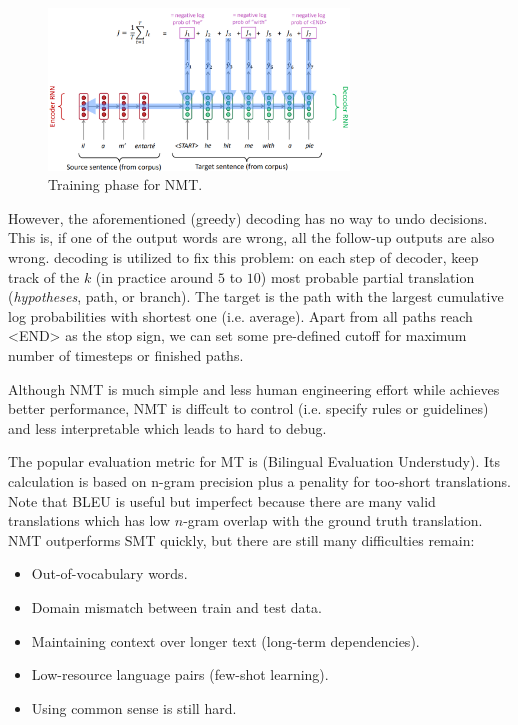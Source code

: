 \begin{figure}[!thp]
	\centerline{\includegraphics[width=8.0cm]{figs/NMT_training.png}}
	\caption{Training phase for NMT.}
	\label{fig:NMT_training}
\end{figure}

However, the aforementioned (greedy) decoding has no way to undo decisions. This is, if one of the output words are wrong, all the follow-up outputs are also wrong.
 decoding is utilized to fix this problem: on each step of decoder, keep track of the $k$ (in practice around $5$ to $10$) most probable partial translation (\emph{hypotheses}, path, or branch).
The target is the path with the largest cumulative log probabilities with shortest one (i.e. average).
Apart from all paths reach <END> as the stop sign, we can set some pre-defined cutoff for maximum number of timesteps or finished paths.

Although NMT is much simple and less human engineering effort while achieves better performance, NMT is diffcult to control (i.e. specify rules or guidelines) and less interpretable which leads to hard to debug.

The popular evaluation metric for MT is  (Bilingual Evaluation Understudy).
Its calculation is based on n-gram precision plus a penality for too-short translations.
Note that BLEU is useful but imperfect because there are many valid translations which has low $n$-gram overlap with the ground truth translation.
NMT outperforms SMT quickly, but there are still many difficulties remain:
\begin{itemize}
	\item Out-of-vocabulary words.
	\item Domain mismatch between train and test data.
	\item Maintaining context over longer text (long-term dependencies).
	\item Low-resource language pairs (few-shot learning).
	\item Using common sense is still hard.
\end{itemize}

